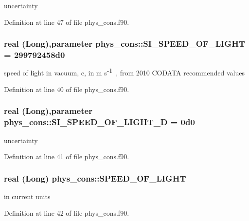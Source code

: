 uncertainty 



Definition at line 47 of file phys\_\-cons.f90.

\hypertarget{namespacephys__cons_ae265fad966cfc841f9a073a52955d742}{
\subsubsection[{SI\_\-SPEED\_\-OF\_\-LIGHT}]{\setlength{\rightskip}{0pt plus 5cm}real (Long),parameter {\bf phys\_\-cons::SI\_\-SPEED\_\-OF\_\-LIGHT} = 299792458d0}}
\label{namespacephys__cons_ae265fad966cfc841f9a073a52955d742}


speed of light in vacuum, c, in m s$^{\mbox{-\/1}}$ , from 2010 CODATA recommended values 



Definition at line 40 of file phys\_\-cons.f90.

\hypertarget{namespacephys__cons_a5547546b06eb8853e52e304b25cc7596}{
\subsubsection[{SI\_\-SPEED\_\-OF\_\-LIGHT\_\-D}]{\setlength{\rightskip}{0pt plus 5cm}real (Long),parameter {\bf phys\_\-cons::SI\_\-SPEED\_\-OF\_\-LIGHT\_\-D} = 0d0}}
\label{namespacephys__cons_a5547546b06eb8853e52e304b25cc7596}


uncertainty 



Definition at line 41 of file phys\_\-cons.f90.

\hypertarget{namespacephys__cons_ac31faa4bb5e82aecbdffa3b3d43a1736}{
\subsubsection[{SPEED\_\-OF\_\-LIGHT}]{\setlength{\rightskip}{0pt plus 5cm}real (Long) {\bf phys\_\-cons::SPEED\_\-OF\_\-LIGHT}}}
\label{namespacephys__cons_ac31faa4bb5e82aecbdffa3b3d43a1736}


in current units 



Definition at line 42 of file phys\_\-cons.f90.

